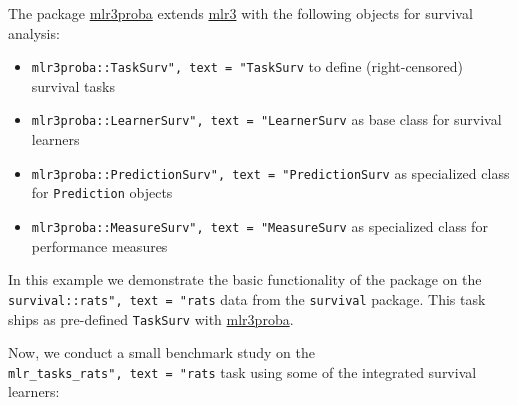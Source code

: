 \documentclass[
  11pt,
  parskip=half,
  DIV=calc,
  BCOR=10mm,
  x11names]{scrbook}
\newenvironment{Shaded}{}{}
\newcommand{\CommentTok}[1]{\textcolor[rgb]{0.00,0.50,0.00}{#1}}
\newcommand{\KeywordTok}[1]{\textcolor[rgb]{0.00,0.00,1.00}{#1}}
\newcommand{\NormalTok}[1]{#1}
\newcommand{\OperatorTok}[1]{#1}
\newcommand{\StringTok}[1]{\textcolor[rgb]{0.00,0.50,0.50}{#1}}
\providecommand{\tightlist}{%
  \setlength{\itemsep}{0pt}\setlength{\parskip}{0pt}}
\begin{document}
The package \href{https://mlr3proba.mlr-org.com}{mlr3proba} extends \href{https://mlr3.mlr-org.com}{mlr3} with the following objects for survival analysis:

\begin{itemize}
\tightlist
\item
  \texttt{mlr3proba::TaskSurv",\ text\ =\ "TaskSurv} to define (right-censored) survival tasks
\item
  \texttt{mlr3proba::LearnerSurv",\ text\ =\ "LearnerSurv} as base class for survival learners
\item
  \texttt{mlr3proba::PredictionSurv",\ text\ =\ "PredictionSurv} as specialized class for \texttt{Prediction} objects
\item
  \texttt{mlr3proba::MeasureSurv",\ text\ =\ "MeasureSurv} as specialized class for performance measures
\end{itemize}

In this example we demonstrate the basic functionality of the package on the \texttt{survival::rats",\ text\ =\ "rats} data from the \texttt{survival} package.
This task ships as pre-defined \texttt{TaskSurv} with \href{https://mlr3proba.mlr-org.com}{mlr3proba}.

\begin{Shaded}
\end{Shaded}

Now, we conduct a small benchmark study on the \texttt{mlr\_tasks\_rats",\ text\ =\ "rats} task using some of the integrated survival learners:
\end{document}
